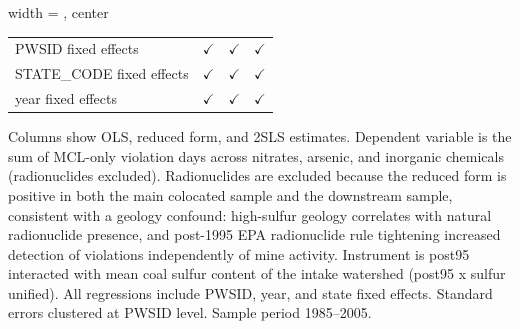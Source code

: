 \begin{table}[htbp]
\begin{adjustbox}{width = \textwidth, center}
\begin{tabular}{lccc}
          \\
         
         PWSID fixed effects                               & $\checkmark$          & $\checkmark$  & $\checkmark$\\   
         STATE\_CODE fixed effects                         & $\checkmark$          & $\checkmark$  & $\checkmark$\\   
         year fixed effects                                & $\checkmark$          & $\checkmark$  & $\checkmark$\\   
         
         \bottomrule
         
      \end{tabular}
      
      
      
   \end{adjustbox}
      {\tiny\linespread{1}\selectfont \par \raggedright 
   Columns show OLS, reduced form, and 2SLS estimates. Dependent variable is the sum of MCL-only violation days across nitrates, arsenic, and inorganic chemicals (radionuclides excluded). Radionuclides are excluded because the reduced form is positive in both the main colocated sample and the downstream sample, consistent with a geology confound: high-sulfur geology correlates with natural radionuclide presence, and post-1995 EPA radionuclide rule tightening increased detection of violations independently of mine activity. Instrument is post95 interacted with mean coal sulfur content of the intake watershed (post95 x sulfur unified). All regressions include PWSID, year, and state fixed effects. Standard errors clustered at PWSID level. Sample period 1985--2005.}
   
\end{table}


